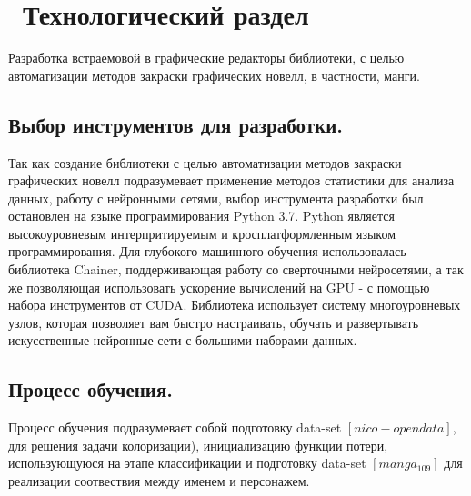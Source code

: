 \chapter{ Технологический раздел}
\label{cha:design}

Разработка встраемовой в графические редакторы библиотеки, с целью автоматизации методов закраски графических новелл, в частности, манги.


\section{Выбор инструментов для разработки.}
Так как создание библиотеки с целью автоматизации методов закраски графических новелл подразумевает применение методов статистики для анализа данных, работу с нейронными сетями, выбор инструмента разработки был остановлен на языке программирования Python 3.7. Python является высокоуровневым интерпритируемым и кросплатформленным языком программирования. Для глубокого машинного обучения использовалась библиотека Chainer, поддерживающая работу со сверточными нейросетями, а так же позволяющая использовать ускорение вычислений на GPU - с помощью набора инструментов от CUDA. Библиотека использует систему многоуровневых узлов, которая позволяет вам быстро настраивать, обучать и развертывать искусственные нейронные сети с большими наборами данных. 

\section{Процесс обучения.}
Процесс обучения подразумевает собой подготовку data-set $[nico-opendata]$, для решения задачи колоризации), инициализацию функции потери, использующуюся на этапе классификации и подготовку data-set  $[manga_109]$ для реализации соотвествия между именем и персонажем.


